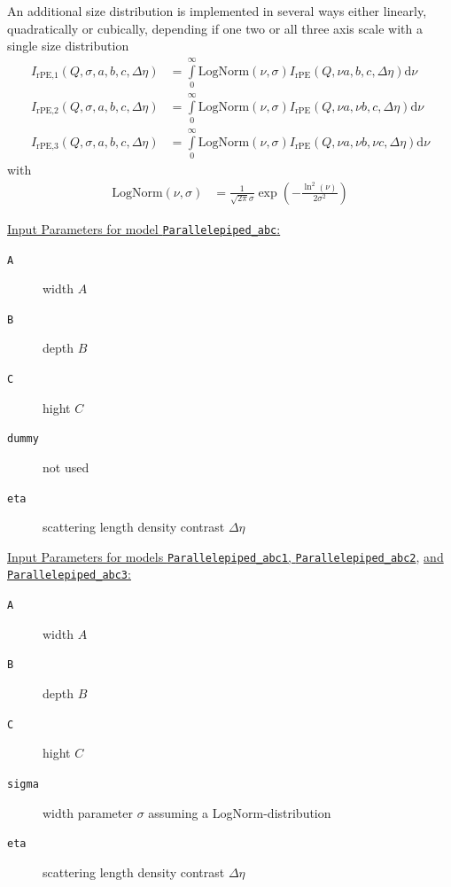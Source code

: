 An additional size distribution is implemented in several ways either linearly, quadratically or cubically, depending if one two or all three axis scale with a single size distribution
\begin{align}
I_\text{rPE,1}(Q,\sigma, a, b,c,\Delta\eta) &= \int\limits_0^\infty \textrm{LogNorm}(\nu,\sigma) I_\text{rPE}(Q,\nu a,b,c,\Delta\eta) \mathrm{d}\nu \\
I_\text{rPE,2}(Q,\sigma, a, b,c,\Delta\eta) &= \int\limits_0^\infty \textrm{LogNorm}(\nu,\sigma) I_\text{rPE}(Q,\nu a,\nu b,c,\Delta\eta) \mathrm{d}\nu \\
I_\text{rPE,3}(Q,\sigma, a, b,c,\Delta\eta) &= \int\limits_0^\infty \textrm{LogNorm}(\nu,\sigma) I_\text{rPE}(Q,\nu a,\nu b,\nu c,\Delta\eta) \mathrm{d}\nu
\end{align}
with
\begin{align}
\textrm{LogNorm}(\nu,\sigma) &= \frac{1}{\sqrt{2\pi}\sigma} \exp\left(-\frac{\ln^2(\nu)}{2\sigma^2}\right)
\end{align}

\vspace{5mm}

\noindent \uline{Input Parameters for model \texttt{Parallelepiped\_abc}:}\\
\begin{description}
\item[\texttt{A}] width $A$
\item[\texttt{B}] depth $B$
\item[\texttt{C}] hight $C$
\item[\texttt{dummy}] not used
\item[\texttt{eta}] scattering length density contrast $\Delta\eta$
\end{description}

\noindent \uline{Input Parameters for models \texttt{Parallelepiped\_abc1}, \texttt{Parallelepiped\_abc2}}, \uline{and \texttt{Parallelepiped\_abc3}:}\\
\begin{description}
\item[\texttt{A}] width $A$
\item[\texttt{B}] depth $B$
\item[\texttt{C}] hight $C$
\item[\texttt{sigma}] width parameter $\sigma$ assuming a LogNorm-distribution
\item[\texttt{eta}] scattering length density contrast $\Delta\eta$
\end{description}

